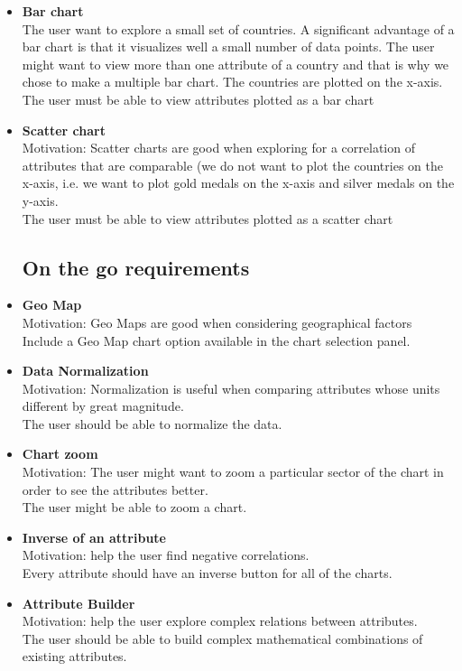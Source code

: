\documentclass[a4paper]{article}
\begin{document}
\begin{itemize}
\item{\textbf{Bar chart}\\The user want to explore a small set of countries. A significant advantage of a bar chart is that it visualizes well a small number of data points. The user might want to view more than one attribute of a country and that is why we chose to make a multiple bar chart. The countries are plotted on the x-axis.\\The user must be able to view attributes plotted as a bar chart}
\item{\textbf{Scatter chart}\\Motivation: Scatter charts are good when exploring for a correlation of attributes that are comparable (we do not want to plot the countries on the x-axis, i.e. we want to plot gold medals on the x-axis and silver medals on the y-axis.\\The user must be able to view attributes plotted as a scatter chart}

\subsection{On the go requirements}
\item{\textbf{Geo Map}\\Motivation: Geo Maps are good when considering geographical factors\\Include a Geo Map chart option available in the chart selection panel.}
\item{\textbf{Data Normalization}\\Motivation: Normalization is useful when comparing attributes whose units different by great magnitude.\\The user should be able to normalize the data.}
\item{\textbf{Chart zoom}\\Motivation: The user might want to zoom a particular sector of the chart in order to see the attributes better.\\The user might be able to zoom a chart.}
\item{\textbf{Inverse of an attribute}\\ Motivation: help the user find negative correlations.\\Every attribute should have an inverse button for all of the charts.}
\item{\textbf{Attribute Builder}\\Motivation: help the user explore complex relations between attributes.\\The user should be able to build complex mathematical combinations of existing attributes.}


\end{itemize}
\end{document}
